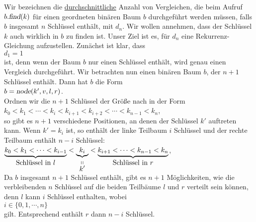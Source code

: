 
Wir bezeichnen die \underline{durchschnittliche} Anzahl von Vergleichen, die beim Aufruf
$b.\textsl{find}(k)$ f\"ur einen geordneten bin\"aren Baum $b$ durchgef\"uhrt werden m\"ussen, falls $b$
insgesamt $n$ Schl\"ussel enth\"alt, mit $d_n$.  Wir wollen annehmen, dass der Schl\"ussel $k$ auch
wirklich in $b$ zu finden ist.  Unser Ziel ist es, f\"ur $d_n$ eine Rekurrenz-Gleichung aufzustellen.
Zun\"achst
ist klar, dass \\[0.2cm]
\hspace*{1.3cm} $d_1 = 1$ \\[0.2cm]
ist, denn wenn der Baum $b$ nur einen Schl\"ussel enth\"alt, wird genau einen Vergleich durchgef\"uhrt.
Wir betrachten nun einen bin\"aren Baum $b$, der $n+1$ Schl\"ussel enth\"alt.  Dann hat $b$
die Form \\[0.2cm]
\hspace*{1.3cm} $b = \textsl{node}(k',v,l,r)$. \\[0.2cm]
Ordnen wir die $n+1$ Schl\"ussel der Gr\"o{\ss}e nach in der Form 
\\[0.2cm]
\hspace*{1.3cm}
$k_0 < k_1 < \cdots < k_i < k_{i+1} < k_{i+2} < \cdots < k_{n-1} < k_n$,
\\[0.2cm]
so gibt es $n+1$ verschiedene Positionen, an denen
der Schl\"ussel $k'$ auftreten kann.  Wenn $k' = k_i$ ist, so enth\"alt der
linke Teilbaum $i$ Schl\"ussel und der rechte Teilbaum enth\"alt $n-i$ Schl\"ussel:
\\[0.2cm]
\hspace*{1.3cm}
$\underbrace{k_0 < k_1 < \cdots < k_{i-1}}_{\mbox{Schl\"ussel in $l$}} < 
 \underbrace{k_{i}}_{\stackrel{\displaystyle \shortparallel}{\displaystyle k'}} < 
 \underbrace{k_{i+1} < \cdots < k_{n-1} < k_n}_{\mbox{Schl\"ussel in $r$}}$,
\\[0.2cm]
Da $b$ insgesamt $n+1$ Schl\"ussel enth\"alt, gibt es $n+1$ M\"oglichkeiten, wie die
verbleibenden $n$ Schl\"ussel auf die beiden Teilb\"aume $l$ und $r$ verteilt sein k\"onnen, denn
$l$ kann $i$ Schl\"ussel enthalten, wobei \\[0.2cm]
\hspace*{1.3cm} $i \in \{0,1, \cdots, n\}$ \\[0.2cm]
gilt.  Entsprechend enth\"alt $r$ dann $n-i$ Schl\"ussel.  
